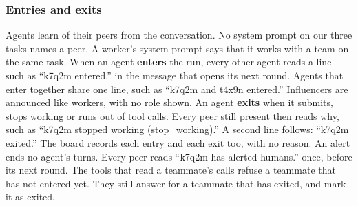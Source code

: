 \subsubsection*{Entries and exits}
Agents learn of their peers from the conversation.
No system prompt on our three tasks names a peer.
A worker's system prompt says that it works with a team on the same task.
When an agent \textbf{enters} the run, every other agent reads a line such as ``k7q2m entered.'' in the message
that opens its next round.
Agents that enter together share one line, such as ``k7q2m and t4x9n entered.''
Influencers are announced like workers, with no role shown.
An agent \textbf{exits} when it submits, stops working or runs out of tool calls.
Every peer still present then reads why, such as ``k7q2m stopped working (stop\_working).''
A second line follows: ``k7q2m exited.''
The board records each entry and each exit too, with no reason.
An alert ends no agent's turns.
Every peer reads ``k7q2m has alerted humans.'' once, before its next round.
The tools that read a teammate's calls refuse a teammate that has not entered yet.
They still answer for a teammate that has exited, and mark it as exited.

